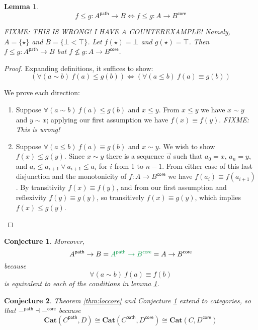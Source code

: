 \documentclass{article}
\newtheorem{conjecture}{Conjecture}
\newtheorem{lemma}{Lemma}
\newcommand{\ms}[1]{\ensuremath{\mathsf{#1}}}
\newcommand{\mb}[1]{\ensuremath{\mathbf{#1}}}
\newcommand{\iso}{\ms{core}}
\renewcommand{\path}{\ms{path}}
\newcommand{\pathto}{\sim}
\begin{document}
\begin{lemma}\label{lem:loccore-2}
  \color{red}
  \[f \le g : A^\path \to B \iff f \le g : A \to B^\iso \]

  \emph{FIXME: THIS IS WRONG! I HAVE A COUNTEREXAMPLE! Namely, $A = \{\star\}$
  and $B = \{\bot < \top\}$. Let $f(\star) = \bot$ and $g(\star) = \top$. Then
  $f \le g : A^\path \to B$ but $f \not\le g : A \to B^\iso$.}
\end{lemma}

\begin{proof}
  Expanding definitions, it suffices to show:
  \[ (\forall(a \pathto b)\ f(a) \le g(b))
  \iff
  (\forall(a \le b)\ f(a) \equiv g(b))
  \]

  We prove each direction:
  \begin{enumerate}
  \item Suppose $\forall(a \pathto b)\ f(a) \le g(b)$ and $x \le y$. From $x \le
    y$ we have $x \pathto y$ and $y \pathto x$; {\color{red} applying our first
      assumption we have $f(x) \equiv f(y)$. \emph{FIXME: This is wrong!}}

  \item Suppose $\forall(a \le b)\ f(a) \equiv g(b)$ and $x \pathto y$. We wish
    to show $f(x) \le g(y)$. Since $x \pathto y$ there is a sequence $\vec{a}$
    such that $a_0 = x$, $a_n = y$, and $a_i \le a_{i+1} \vee a_{i+1} \le a_i$
    for $i$ from 1 to $n-1$. From either case of this last disjunction and the
    monotonicity of $f : A \to B^\iso$ we have $f(a_i) \equiv f(a_{i+1})$. By
    transitivity $f(x) \equiv f(y)$, and from our first assumption and
    reflexivity $f(y) \equiv g(y)$, so transitively $f(x) \equiv g(y)$, which
    implies $f(x) \le g(y)$.
  \end{enumerate}
\end{proof}

\begin{conjecture} \label{cnj:loccore} Moreover,
  \[ A^\path \to B = {\color{ForestGreen} A^\path \to B^\iso} = A \to B^\iso \]
  because
  \[ \forall(a \pathto b)\ f(a) \equiv f(b) \]
  is equivalent to each of the conditions in lemma \ref{lem:loccore-2}.
\end{conjecture}


\begin{conjecture}
  Theorem \ref{thm:loccore} and Conjecture \ref{cnj:loccore} extend to
  categories, so that $-^\path \dashv -^\iso$ because
  \begin{equation}
    \mb{Cat}(C^\path, D) \cong \mb{Cat}(C^\path, D^\iso) \cong \mb{Cat}(C, D^\iso)
  \end{equation}
\end{conjecture}
\end{document}
